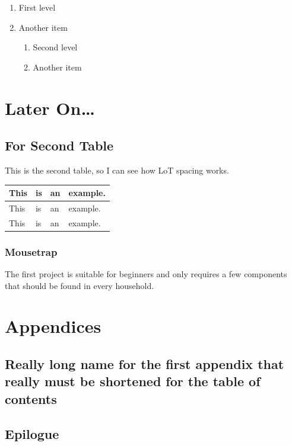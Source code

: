 \documentclass[
    chapterprefix=false,
    appendixprefix=true,
    headings=big,
    headings=optiontotoc,
    listof=chaptergapnone,
    open=right
  ]{scrbook}
\begin{document}
\begin{enumerate}
    \item First level
    \item Another item
    \begin{enumerate}
        \item Second level
        \item Another item
    \end{enumerate}
\end{enumerate}

\blinddocument
\part{Later On\ldots}

\chapter{For Second Table}
This is the second table, so I can see how LoT spacing works.

\begin{table}
    \centering
    \begin{tabular}{llll}
        This & is & an & example.\\ \hline
        This & is & an & example.\\
        This & is & an & example.
    \end{tabular}
\end{table}

\section{Mousetrap}
The first project is suitable for beginners and only requires a few components that should be found in every household.

\blinddocument

\part{Appendices}
\appendix
\chapter[Short Name]{Really long name for the first appendix that really must be shortened for the table of contents}
\blindtext[1]

\backmatter
\chapter{Epilogue}
\blindtext[1]
\end{document}
